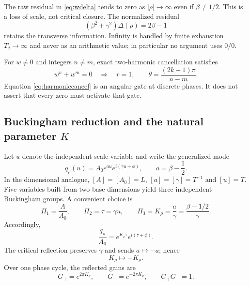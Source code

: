 \documentclass[11pt]{amsart}
\theoremstyle{definition}
\theoremstyle{remark}
\begin{document}
The raw residual in \eqref{eq:wdelta} tends to zero as $|\rho|\to\infty$ even if
$\beta\ne1/2$.  This is a loss of scale, not critical closure.  The normalized residual
\begin{equation}\label{eq:normalizedresidual}
 (\beta^2+\gamma^2)\Delta(\rho)=2\beta-1
\end{equation}
retains the transverse information.  Infinity is handled by finite exhaustion
$T_j\to\infty$ and never as an arithmetic value; in particular no argument uses $0/0$.

For $w\ne0$ and integers $n\ne m$, exact two-harmonic cancellation satisfies
\begin{equation}\label{eq:harmoniccancel}
 w^n+w^m=0
 \quad\Longrightarrow\quad
 r=1,
 \qquad
 \theta=\frac{(2k+1)\pi}{n-m}.
\end{equation}
Equation \eqref{eq:harmoniccancel} is an angular gate at discrete phases.  It does not assert
that every zero must activate that gate.

\subsection{Buckingham reduction and the natural parameter $K$}
Let $u$ denote the independent scale variable and write the generalized mode
\begin{equation}\label{eq:modeau}
 q_\rho(u)=A_0e^{au}e^{i(\gamma u+\phi)},
 \qquad a=\beta-\frac12.
\end{equation}
In the dimensional analogue, $[A]=[A_0]=L$, $[a]=[\gamma]=T^{-1}$ and $[u]=T$.
Five variables built from two base dimensions yield three independent Buckingham groups.
A convenient choice is
\begin{equation}\label{eq:PiGroups}
 \Pi_1=\frac A{A_0},
 \qquad \Pi_2=\tau=\gamma u,
 \qquad \Pi_3=K_\rho=\frac a\gamma
 =\frac{\beta-1/2}{\gamma}.
\end{equation}
Accordingly,
\begin{equation}\label{eq:reducedmode}
 \frac{q_\rho}{A_0}=e^{K_\rho\tau}e^{i(\tau+\phi)}.
\end{equation}
The critical reflection preserves $\gamma$ and sends $a\mapsto-a$; hence
\begin{equation}\label{eq:Kreflection}
 K_\rho\mapsto-K_\rho.
\end{equation}
Over one phase cycle, the reflected gains are
\begin{equation}\label{eq:cyclegains}
 G_+=e^{2\pi K_\rho},
 \qquad G_-=e^{-2\pi K_\rho},
 \qquad G_+G_-=1.
\end{equation}
\end{document}
